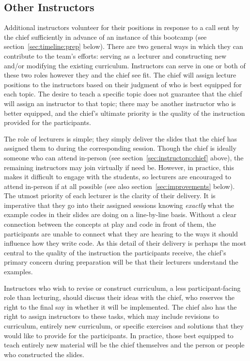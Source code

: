\subsection{Other Instructors}
\label{sec:instructors:others}
\noindent
Additional instructors volunteer for their positions in response to a call sent
by the chief sufficiently in advance of an instance of this bootcamp (see
section~\ref{sec:timeline:prep} below).
There are two general ways in which they can contribute to the team's efforts:
serving as a lecturer and constructing new and/or modifying the existing
curriculum.
Instructors can serve in one or both of these two roles however they and the
chief see fit.
The chief will assign lecture positions to the instructors based on their
judgment of who is best equipped for each topic.
The desire to teach a specific topic does not guarantee that the chief will
assign an instructor to that topic; there may be another instructor who is
better equipped, and the chief's ultimate priority is the quality of the
instruction provided for the participants.
\par
The role of lecturers is simple; they simply deliver the slides that the chief
has assigned them to during the corresponding session.
Though the chief is ideally someone who can attend in-person (see
section~\ref{sec:instructors:chief} above), the remaining instructors may join
virtually if need be.
However, in practice, this makes it difficult to engage with the students, so
lecturers are encouraged to attend in-person if at all possible (see also
section~\ref{sec:improvements} below).
The utmost priority of each lecturer is the clarity of their delivery.
It is imperative that they go into their assigned sessions knowing
\textit{exactly} what the example codes in their slides are doing on a
line-by-line basis.
Without a clear connection between the concepts at play and code in front of
them, the participants are unable to connect what they are hearing to the ways
it should influence how they write code.
As this detail of their delivery is perhaps the most central to the quality of
the instruction the participants receive, the chief's primary concern during
preparation will be that their lecturers understand the examples.
\par
Instructors who wish to revise or construct curriculum, a less
participant-facing role than lecturing, should discuss their ideas with the
chief, who reserves the right to the final say in whether it will be
implemented.
The chief also has the right to assign instructors to these tasks, which may
include revisions to curriculum, entirely new curriculum, or specific exercises
and solutions that they would like to provide for the participants.
In practice, those best equipped to teach entirely new material will be the
chief themselves and the person or people who constructed the slides.




